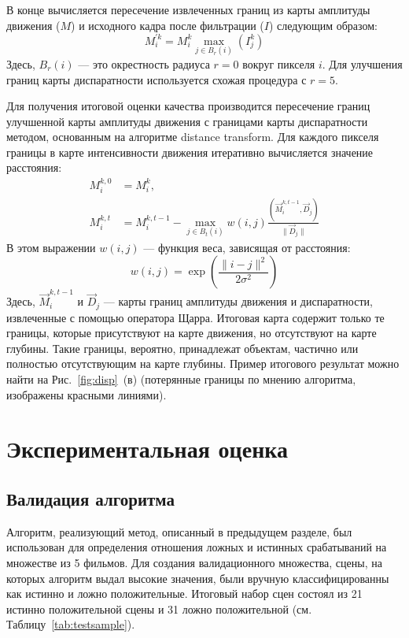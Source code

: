 \documentclass[14pt, a4paper]{extarticle}
\begin{document}
В конце вычисляется пересечение извлеченных границ из карты амплитуды движения ($M$) 
и исходного кадра после фильтрации  ($I$) следующим образом:
\begin{equation}
M_i^{'k} =M_i^k\max_{j  \in B_{r}(i)}(I_j^k)
\end{equation}
Здесь, $B_{r}(i)$ --- это окрестность радиуса $r = 0$ вокруг пикселя $i$. Для улучшения границ 
карты диспаратности используется схожая процедура с $r = 5$.

Для получения итоговой оценки качества производится пересечение границ улучшенной карты
амплитуды движения с границами карты диспаратности методом, основанным на алгоритме
distance transform. Для каждого пикселя границы в карте интенсивности движения итеративно
вычисляется значение расстояния:
\begin{equation}
\begin{split}
M_i^{k,0} &= M_i^k, \\
M_i^{k,t} &= M_i^{k,t-1} - \max_{j \in B_t(i)}w(i,j)\frac{\left(\vec{M}_i^{k,t-1}, \vec{D}_j  \right)}{\lVert\vec{D}_j\rVert}
\end{split}
\end{equation}
В этом выражении $w(i,j)$  --- функция веса, зависящая от расстояния:
\begin{equation}
w(i,j) = \exp\left(\frac{\lVert i-j \rVert^2}{2\sigma^2}\right)
\end{equation}
Здесь, $\vec{M}_i^{k,t-1}$ и $\vec{D}_j$ --- карты границ амплитуды движения и диспаратности, 
извлеченные с помощью оператора Щарра. Итоговая карта содержит только те границы,
которые присутствуют на карте движения, но отсутствуют на карте глубины. Такие границы,
вероятно, принадлежат объектам, частично или полностью отсутствующим на карте глубины.
Пример итогового результат можно найти на Рис.~\ref{fig:disp}~(в) (потерянные границы 
по мнению алгоритма, изображены красными линиями).

\newpage
\section{Экспериментальная оценка}

\subsection{Валидация алгоритма}



Алгоритм, реализующий метод, описанный в предыдущем разделе, был использован 
для определения отношения ложных и истинных срабатываний на множестве из 5 фильмов.
Для создания валидационного множества, сцены, на которых алгоритм выдал высокие значения, 
были вручную классифицированны как истинно и ложно положительные. 
Итоговый набор сцен состоял из 21 истинно положительной сцены 
и 31 ложно положительной (см. Таблицу~\ref{tab:testsample}).
\end{document}

